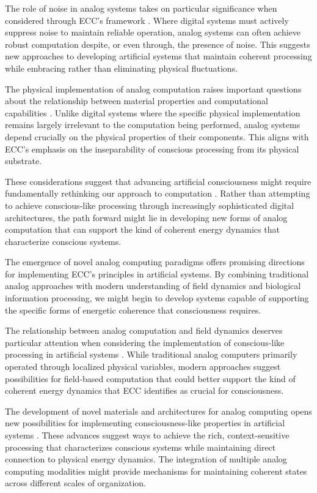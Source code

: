 The role of noise in analog systems takes on particular significance when considered through ECC's framework \cite{Davies2019}. Where digital systems must actively suppress noise to maintain reliable operation, analog systems can often achieve robust computation despite, or even through, the presence of noise. This suggests new approaches to developing artificial systems that maintain coherent processing while embracing rather than eliminating physical fluctuations.

The physical implementation of analog computation raises important questions about the relationship between material properties and computational capabilities \cite{Dewdney1984}. Unlike digital systems where the specific physical implementation remains largely irrelevant to the computation being performed, analog systems depend crucially on the physical properties of their components. This aligns with ECC's emphasis on the inseparability of conscious processing from its physical substrate.

These considerations suggest that advancing artificial consciousness might require fundamentally rethinking our approach to computation \cite{Earman1993}. Rather than attempting to achieve conscious-like processing through increasingly sophisticated digital architectures, the path forward might lie in developing new forms of analog computation that can support the kind of coherent energy dynamics that characterize conscious systems.

The emergence of novel analog computing paradigms offers promising directions for implementing ECC's principles in artificial systems. By combining traditional analog approaches with modern understanding of field dynamics and biological information processing, we might begin to develop systems capable of supporting the specific forms of energetic coherence that consciousness requires.

The relationship between analog computation and field dynamics deserves particular attention when considering the implementation of conscious-like processing in artificial systems \cite{Ambainis2015}. While traditional analog computers primarily operated through localized physical variables, modern approaches suggest possibilities for field-based computation that could better support the kind of coherent energy dynamics that ECC identifies as crucial for consciousness.

The development of novel materials and architectures for analog computing opens new possibilities for implementing consciousness-like properties in artificial systems \cite{Thompson2009}. These advances suggest ways to achieve the rich, context-sensitive processing that characterizes conscious systems while maintaining direct connection to physical energy dynamics. The integration of multiple analog computing modalities might provide mechanisms for maintaining coherent states across different scales of organization.

